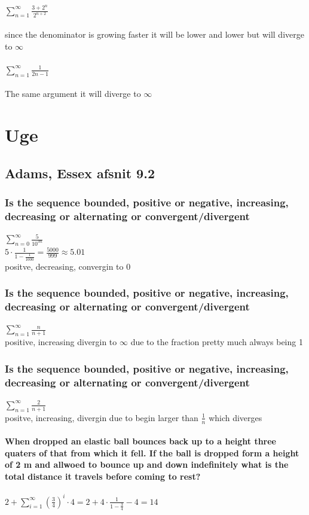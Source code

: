\documentclass[12pt, a4paper]{report}
\begin{document}
			\subsubsection{$\sum\limits_{n=1}^\infty\frac{3+2^n}{2^{n+2}}$}
				since the denominator is growing faster it will be lower and lower but will diverge to $\infty$
			\subsubsection{$\sum\limits_{n=1}^\infty\frac{1}{2n-1}$}
				The same argument it will diverge to $\infty$
	\chapter{Uge}
		\section{Adams, Essex afsnit 9.2}
			\setcounter{subsubsection}{3}
				\subsection{Is the sequence bounded, positive or negative, increasing, decreasing or alternating or convergent/divergent}
					$\sum\limits_{n=0}^{\infty}\frac{5}{10^{3n}}$\\
					$5\cdot \frac{1}{1-\frac{1}{1000}}=\frac{5000}{999}\approx 5.01$\\
					positve, decreasing, convergin to 0
			\setcounter{subsubsection}{15}
				\subsection{Is the sequence bounded, positive or negative, increasing, decreasing or alternating or convergent/divergent}
					$\sum\limits_{n=1}^{\infty}\frac{n}{n+1}$\\
					positive, increasing divergin to $\infty$ due to the fraction pretty much always being 1
			\setcounter{subsubsection}{17}
				\subsection{Is the sequence bounded, positive or negative, increasing, decreasing or alternating or convergent/divergent}
					$\sum\limits_{n=1}^{\infty}\frac{2}{n+1}$\\
					positve, increasing, divergin due to begin larger than $\frac{1}{n}$ which diverges
			\setcounter{subsubsection}{20}
			\subsubsection{When dropped an elastic ball bounces back up to a height three quaters of that from which it fell. If the ball is dropped form a height of 2 m and allwoed to bounce up and down indefinitely what is the total distance it travels before coming to rest?}
				$2+\sum\limits_{i=1}^{\infty}(\frac{3}{4})^i\cdot 4=2+4\cdot \frac{1}{1-\frac{3}{4}}-4=14$\\
		\setcounter{section}{0}
\end{document}
